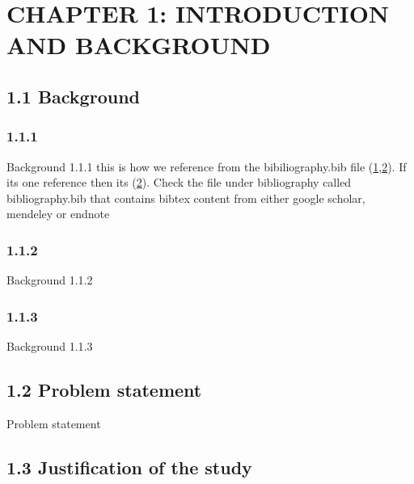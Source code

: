 \documentclass[12pt,]{article}
\begin{document}
\newpage


\justify
\addtocounter{section}{1}

\section{\texorpdfstring{CHAPTER 1: INTRODUCTION AND BACKGROUND
\label{label1}}{CHAPTER 1: INTRODUCTION AND BACKGROUND }}\label{chapter-1-introduction-and-background}

\subsection{1.1 Background}\label{background}

\subsubsection{1.1.1}\label{section}

Background 1.1.1 this is how we reference from the bibiliography.bib
file
(\protect\hyperlink{ref-Black2013}{1},\protect\hyperlink{ref-Black2008}{2}).
If its one reference then its (\protect\hyperlink{ref-Black2008}{2}).
Check the file under bibliography called bibliography.bib that contains
bibtex content from either google scholar, mendeley or endnote

\subsubsection{1.1.2}\label{section-1}

Background 1.1.2

\subsubsection{1.1.3}\label{section-2}

Background 1.1.3

\subsection{1.2 Problem statement}\label{problem-statement}

Problem statement

\subsection{1.3 Justification of the
study}\label{justification-of-the-study}
\end{document}
